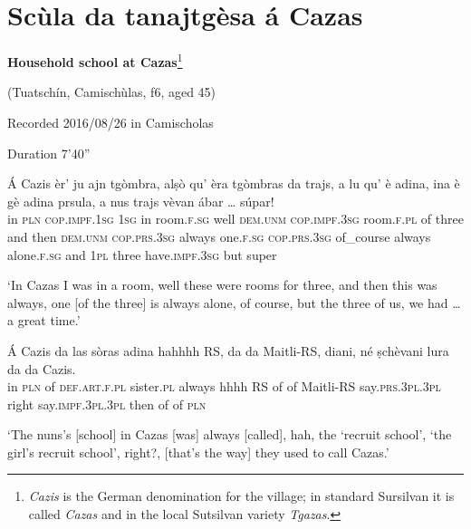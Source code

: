 \section{Scùla da tanajtgèsa á Cazas}

\noindent
\textbf{Household school at Cazas}\footnote{\textit{Cazis} is the German denomination for the village; in standard Sursilvan it is called \textit{Cazas} and in the local Sutsilvan variety \textit{Tgazas}.}

\noindent
(Tuatschín, Camischùlas, f6, aged 45)

\noindent
Recorded 2016/08/26 in Camischolas

\noindent
Duration 7'40''

\bigskip

\begin{linenumbers}
\gll    Á Cazis èr’ ju ajn tgòmbra, alṣò qu’ èra tgòmbras da trajs, a lu qu’ è adina, ina è gè adina prsula, a nus trajs vèvan ábar … súpar!\\
in \textsc{pln} \textsc{cop.impf.1sg}	\textsc{1sg} in room.\textsc{f.sg} well \textsc{dem.unm} \textsc{cop.impf.3sg} room.\textsc{f.pl} of three and then \textsc{dem.unm} \textsc{cop.prs.3sg} always  one.\textsc{f.sg} \textsc{cop.prs.3sg} of\_course always alone.\textsc{f.sg} and \textsc{1pl} three have.\textsc{impf.3sg} but {} super\\
\end{linenumbers}
\medskip
\glt `In Cazas I was in a room, well these were rooms for three, and then this was always, one [of the three] is always alone, of course, but the three of us, we had … a great time.'
\medskip

\begin{linenumbers}
\gll    Á Cazis da las sòras adina hahhhh RS, da da Maitli-RS, diani, né ṣchèvani lura da da Cazis.\\
in \textsc{pln} of \textsc{def.art.f.pl} sister.\textsc{pl} always hhhh RS of of Maitli-RS\footnotemark{} say.\textsc{prs.3pl.3pl} right say.\textsc{impf.3pl.3pl} then of of \textsc{pln}\\
\end{linenumbers}
\medskip
{} 
\glt `The nuns’s [school] in Cazas [was] always [called], hah, the ‘recruit school’, ‘the girl’s recruit school’, right?, [that’s the way] they used to call Cazas.'
\medskip


